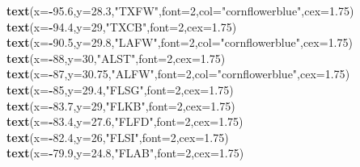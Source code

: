\documentclass[]{article}
\newenvironment{Shaded}{\begin{snugshade}}{\end{snugshade}}
\newcommand{\KeywordTok}[1]{\textcolor[rgb]{0.13,0.29,0.53}{\textbf{#1}}}
\newcommand{\DataTypeTok}[1]{\textcolor[rgb]{0.13,0.29,0.53}{#1}}
\newcommand{\DecValTok}[1]{\textcolor[rgb]{0.00,0.00,0.81}{#1}}
\newcommand{\FloatTok}[1]{\textcolor[rgb]{0.00,0.00,0.81}{#1}}
\newcommand{\StringTok}[1]{\textcolor[rgb]{0.31,0.60,0.02}{#1}}
\newcommand{\OperatorTok}[1]{\textcolor[rgb]{0.81,0.36,0.00}{\textbf{#1}}}
\newcommand{\NormalTok}[1]{#1}
\begin{document}
\begin{Shaded}
\begin{Highlighting}[]
\KeywordTok{text}\NormalTok{(}\DataTypeTok{x=}\OperatorTok{-}\FloatTok{95.6}\NormalTok{,}\DataTypeTok{y=}\FloatTok{28.3}\NormalTok{,}\StringTok{"TXFW"}\NormalTok{,}\DataTypeTok{font=}\DecValTok{2}\NormalTok{,}\DataTypeTok{col=}\StringTok{"cornflowerblue"}\NormalTok{,}\DataTypeTok{cex=}\FloatTok{1.75}\NormalTok{)}
\KeywordTok{text}\NormalTok{(}\DataTypeTok{x=}\OperatorTok{-}\FloatTok{94.4}\NormalTok{,}\DataTypeTok{y=}\DecValTok{29}\NormalTok{,}\StringTok{"TXCB"}\NormalTok{,}\DataTypeTok{font=}\DecValTok{2}\NormalTok{,}\DataTypeTok{cex=}\FloatTok{1.75}\NormalTok{)}
\KeywordTok{text}\NormalTok{(}\DataTypeTok{x=}\OperatorTok{-}\FloatTok{90.5}\NormalTok{,}\DataTypeTok{y=}\FloatTok{29.8}\NormalTok{,}\StringTok{"LAFW"}\NormalTok{,}\DataTypeTok{font=}\DecValTok{2}\NormalTok{,}\DataTypeTok{col=}\StringTok{"cornflowerblue"}\NormalTok{,}\DataTypeTok{cex=}\FloatTok{1.75}\NormalTok{)}
\KeywordTok{text}\NormalTok{(}\DataTypeTok{x=}\OperatorTok{-}\DecValTok{88}\NormalTok{,}\DataTypeTok{y=}\DecValTok{30}\NormalTok{,}\StringTok{"ALST"}\NormalTok{,}\DataTypeTok{font=}\DecValTok{2}\NormalTok{,}\DataTypeTok{cex=}\FloatTok{1.75}\NormalTok{)}
\KeywordTok{text}\NormalTok{(}\DataTypeTok{x=}\OperatorTok{-}\DecValTok{87}\NormalTok{,}\DataTypeTok{y=}\FloatTok{30.75}\NormalTok{,}\StringTok{"ALFW"}\NormalTok{,}\DataTypeTok{font=}\DecValTok{2}\NormalTok{,}\DataTypeTok{col=}\StringTok{"cornflowerblue"}\NormalTok{,}\DataTypeTok{cex=}\FloatTok{1.75}\NormalTok{)}
\KeywordTok{text}\NormalTok{(}\DataTypeTok{x=}\OperatorTok{-}\DecValTok{85}\NormalTok{,}\DataTypeTok{y=}\FloatTok{29.4}\NormalTok{,}\StringTok{"FLSG"}\NormalTok{,}\DataTypeTok{font=}\DecValTok{2}\NormalTok{,}\DataTypeTok{cex=}\FloatTok{1.75}\NormalTok{)}
\KeywordTok{text}\NormalTok{(}\DataTypeTok{x=}\OperatorTok{-}\FloatTok{83.7}\NormalTok{,}\DataTypeTok{y=}\DecValTok{29}\NormalTok{,}\StringTok{"FLKB"}\NormalTok{,}\DataTypeTok{font=}\DecValTok{2}\NormalTok{,}\DataTypeTok{cex=}\FloatTok{1.75}\NormalTok{)}
\KeywordTok{text}\NormalTok{(}\DataTypeTok{x=}\OperatorTok{-}\FloatTok{83.4}\NormalTok{,}\DataTypeTok{y=}\FloatTok{27.6}\NormalTok{,}\StringTok{"FLFD"}\NormalTok{,}\DataTypeTok{font=}\DecValTok{2}\NormalTok{,}\DataTypeTok{cex=}\FloatTok{1.75}\NormalTok{)}
\KeywordTok{text}\NormalTok{(}\DataTypeTok{x=}\OperatorTok{-}\FloatTok{82.4}\NormalTok{,}\DataTypeTok{y=}\DecValTok{26}\NormalTok{,}\StringTok{"FLSI"}\NormalTok{,}\DataTypeTok{font=}\DecValTok{2}\NormalTok{,}\DataTypeTok{cex=}\FloatTok{1.75}\NormalTok{)}
\KeywordTok{text}\NormalTok{(}\DataTypeTok{x=}\OperatorTok{-}\FloatTok{79.9}\NormalTok{,}\DataTypeTok{y=}\FloatTok{24.8}\NormalTok{,}\StringTok{"FLAB"}\NormalTok{,}\DataTypeTok{font=}\DecValTok{2}\NormalTok{,}\DataTypeTok{cex=}\FloatTok{1.75}\NormalTok{)}

\end{Highlighting}
\end{Shaded}
\end{document}
